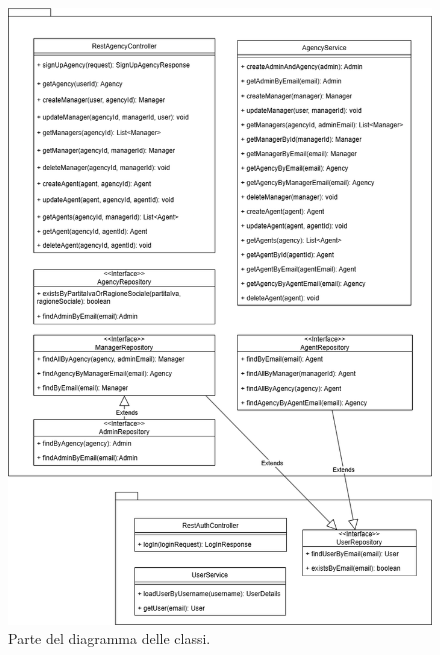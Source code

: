 \begin{figure}[H]
    \centering
    \includegraphics[width=\textwidth]{assets/diagrams/class-diagram/class-diagram-1.png}
    \caption{Parte del diagramma delle classi.}
    \label{fig:Parte 1 del diagramma delle classi}
\end{figure}

